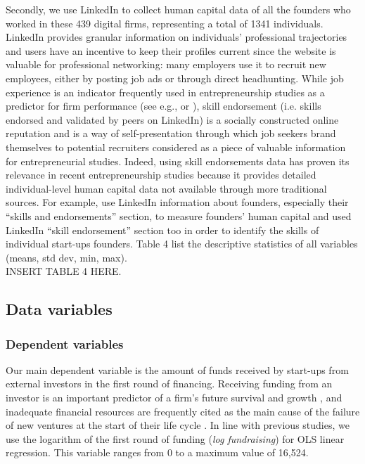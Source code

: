 \documentclass[12pt]{article}
\begin{document}
Secondly, we use LinkedIn to collect human capital data of all the founders who worked in these 439 digital firms, representing a total of 1341 individuals. LinkedIn provides granular information on individuals’ professional trajectories and users have an incentive to keep their profiles current since the website is valuable for professional networking: many employers use it to recruit new employees, either by posting job ads or through direct headhunting. While job experience is an indicator frequently used in entrepreneurship studies as a predictor for firm performance (see e.g., \citet{colombo2005founders} or \citet{delmar2006does}), skill endorsement (i.e. skills endorsed and validated by peers on LinkedIn) is a socially constructed online reputation and is a way of self-presentation through which job seekers brand themselves to potential recruiters \citep{rapanta2017linkedin} considered as a piece of valuable information for entrepreneurial studies. Indeed, using skill endorsements data has proven its relevance in recent entrepreneurship studies because it provides detailed individual-level human capital data not available through more traditional sources. For example, \citet{reese2020should} use LinkedIn information about founders, especially their “skills and endorsements” section, to measure founders’ human capital and \citet{sako2020scaling} used LinkedIn “skill endorsement” section too in order to identify the skills of individual start-ups founders. Table 4\label{table4} list the descriptive statistics of all variables (means, std dev, min, max). \\

INSERT TABLE 4 HERE.

\subsection{Data variables}

\subsubsection{Dependent variables}

Our main dependent variable is the amount of funds received by start-ups from external investors in the first round of financing. Receiving funding from an investor is an important predictor of a firm's future survival and growth \citep{beckman2007early}, and inadequate financial resources are frequently cited as the main cause of the failure of new ventures at the start of their life cycle \citep{franke2008venture, eddleston2016you}. In line with previous studies, we use the logarithm of the first round of funding (\textit{log fundraising}) for OLS linear regression. This variable ranges from 0 to a maximum value of 16,524.
\end{document}
